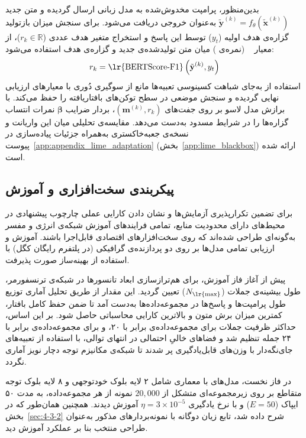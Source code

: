 بدین‌منظور، پرامپت مخدوش‌شده به مدل زبانی ارسال گردیده و متن جدید $\tilde{\mathbf{y}}^{(k)} = f_\theta(\tilde{\mathbf{x}}^{(k)})$ به‌عنوان خروجی دریافت می‌شود. برای سنجش میزان بازتولید گزاره‌ی هدف اولیه ($y_t$) توسط این پاسخ و استخراج متغیر هدف عددی ($r_k \in \mathbb{R}$)، از معیار ~\cite{zhang2020bertscore} (نمره‌ی ) میان متن تولیدشده‌ی جدید و گزاره‌ی هدف استفاده می‌شود:
\begin{equation}\label{eq:chap5_lime_blackbox_bertscore}
    r_k = \text{\lr{BERTScore-F1}}\left(\tilde{\mathbf{y}}^{(k)}, y_t\right)
\end{equation}
استفاده از  به‌جای شباهت کسینوسی تعبیه‌ها مانع از سوگیری دُوری با معیارهای ارزیابی نهایی گردیده و سنجش موضعی در سطح توکن‌های بافتاریافته را حفظ می‌کند. با برازش مدل لاسو بر روی جفت‌های $(\mathbf{m}^{(k)}, r_k)$، بردار ضرایب $\boldsymbol{\beta}$ نمرات انتساب گزاره‌ها را در شرایط مسدود به‌دست می‌دهد. مقایسه‌ی تحلیلی میان این واریانت و نسخه‌ی جعبه‌خاکستری به‌همراه جزئیات پیاده‌سازی در پیوست~\ref{app:appendix_lime_adaptation} (بخش~\ref{app:lime_blackbox}) ارائه شده است.


\subsection{پیکربندی سخت‌افزاری و آموزش}\label{sec:5-1-4}

برای تضمین تکرارپذیری آزمایش‌ها و نشان دادن کارایی عملی چارچوب پیشنهادی در محیط‌های دارای محدودیت منابع، تمامی فرایندهای آموزش شبکه‌ی انرژی و مفسر به‌گونه‌ای طراحی شده‌اند که روی سخت‌افزارهای اقتصادی قابل‌اجرا باشند. آموزش و ارزیابی تمامی مدل‌ها بر روی دو پردازنده‌ی گرافیکی  (در پلتفرم رایگان کگل) با استفاده از بهینه‌ساز  صورت پذیرفت. 

پیش از آغاز فاز آموزش، برای هم‌ترازسازی ابعاد تانسورها در شبکه‌ی ترنسفورمر، طول بیشینه‌ی جملات ($N_{\text{\lr{max}}}$) تعیین گردید. این مقدار از طریق تحلیل آماری توزیع طول پرامپت‌ها و پاسخ‌ها در مجموعه‌داده‌ها به‌دست آمد تا ضمن حفظ کامل بافتار، کمترین میزان برش متون و بالاترین کارایی محاسباتی حاصل شود. بر این اساس، حداکثر ظرفیت جملات برای مجموعه‌داده‌ی  برابر با ۲۰، و برای مجموعه‌داده‌ی  برابر با ۲۴ جمله تنظیم شد و فضاهای خالیِ احتمالی در انتهای توالی، با استفاده از تعبیه‌های جای‌نگه‌دار با وزن‌های قابل‌یادگیری پر شدند تا شبکه‌ی مکانیزم توجه دچار نویز آماری نگردد.

در فاز نخست، مدل‌های  با معماری شامل ۲ لایه بلوک خودتوجهی و ۸ لایه بلوک توجه متقاطع بر روی زیرمجموعه‌ای متشکل از $20,000$ نمونه از هر مجموعه‌داده، به مدت ۵۰ ایپاک ($E=50$) و با نرخ یادگیری $\eta = 3 \times 10^{-5}$ آموزش دیدند. همچنین همان‌طور که در بخش~\ref{sec:4-3-2} شرح داده شد، تابع زیان دوگانه با نمونه‌بردارهای مذکور به‌عنوان طراحی منتخب بنا بر عملکرد آموزش دید.

